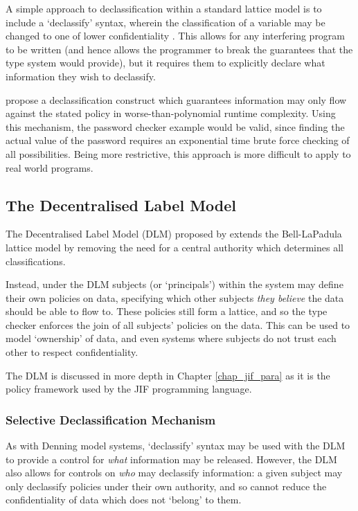 A simple approach to declassification within a standard lattice model is to include a `declassify' syntax, wherein the classification of a variable may be changed to one of lower confidentiality \cite{denning1974declassification}. This allows for any interfering program to be written (and hence allows the programmer to break the guarantees that the type system would provide), but it requires them to explicitly declare what information they  wish to declassify.

\citeauthor{volpano2000declassification} \cite{volpano2000declassification} propose a declassification construct which guarantees information may only flow against the stated policy in worse-than-polynomial runtime complexity. Using this mechanism, the password checker example would be valid, since finding the actual value of the password requires an exponential time brute force checking of all possibilities. Being more restrictive, this approach is more difficult to apply to real world programs.

\subsection{The Decentralised Label Model} \label{theory_if_dlm}

The Decentralised Label Model (DLM) proposed by \citeauthor{myers1997if} \cite{myers1997if} extends the Bell-LaPadula lattice model by removing the need for a central authority which determines all classifications.

Instead, under the DLM subjects (or `principals') within the system may define their own policies on data, specifying which other subjects \textit{they believe} the data should be able to flow to. These policies still form a lattice, and so the type checker enforces the join of all subjects' policies on the data. This can be used to model `ownership' of data, and even systems where subjects do not trust each other to respect confidentiality.

The DLM is discussed in more depth in Chapter \ref{chap_jif_para} as it is the policy framework used by the JIF programming language.

\subsubsection{Selective Declassification Mechanism}

As with Denning model systems, `declassify' syntax may be used with the DLM to provide a control for \textit{what} information may be released. However, the DLM also allows for controls on \textit{who} may declassify information: a given subject may only declassify policies under their own authority, and so cannot reduce the confidentiality of data which does not `belong' to them.


